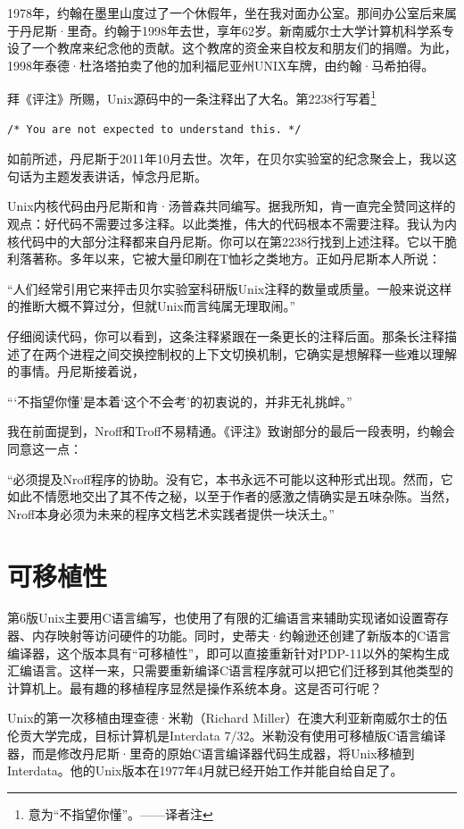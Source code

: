 \documentclass[a4paper,12pt,UTF8,twoside]{ctexbook}
\begin{document}
1978年，约翰在墨里山度过了一个休假年，坐在我对面办公室。那间办公室后来属于丹尼斯·里奇。约翰于1998年去世，享年62岁。新南威尔士大学计算机科学系专设了一个教席来纪念他的贡献。这个教席的资金来自校友和朋友们的捐赠。为此，1998年泰德·杜洛塔拍卖了他的加利福尼亚州UNIX车牌，由约翰·马希拍得。

拜《评注》所赐，Unix源码中的一条注释出了大名。第2238行写着\footnote{意为“不指望你懂”。——译者注}

\begin{lstlisting}
/* You are not expected to understand this. */
\end{lstlisting}


如前所述，丹尼斯于2011年10月去世。次年，在贝尔实验室的纪念聚会上，我以这句话为主题发表讲话，悼念丹尼斯。

Unix内核代码由丹尼斯和肯·汤普森共同编写。据我所知，肯一直完全赞同这样的观点：好代码不需要过多注释。以此类推，伟大的代码根本不需要注释。我认为内核代码中的大部分注释都来自丹尼斯。你可以在第2238行找到上述注释。它以干脆利落著称。多年以来，它被大量印刷在T恤衫之类地方。正如丹尼斯本人所说：

“人们经常引用它来抨击贝尔实验室科研版Unix注释的数量或质量。一般来说这样的推断大概不算过分，但就Unix而言纯属无理取闹。”

仔细阅读代码，你可以看到，这条注释紧跟在一条更长的注释后面。那条长注释描述了在两个进程之间交换控制权的上下文切换机制，它确实是想解释一些难以理解的事情。丹尼斯接着说，

“‘不指望你懂’是本着‘这个不会考’的初衷说的，并非无礼挑衅。”

我在前面提到，Nroff和Troff不易精通。《评注》致谢部分的最后一段表明，约翰会同意这一点：

“必须提及Nroff程序的协助。没有它，本书永远不可能以这种形式出现。然而，它如此不情愿地交出了其不传之秘，以至于作者的感激之情确实是五味杂陈。当然，Nroff本身必须为未来的程序文档艺术实践者提供一块沃土。”

\section{可移植性}

第6版Unix主要用C语言编写，也使用了有限的汇编语言来辅助实现诸如设置寄存器、内存映射等访问硬件的功能。同时，史蒂夫·约翰逊还创建了新版本的C语言编译器，这个版本具有“可移植性”，即可以直接重新针对PDP-11以外的架构生成汇编语言。这样一来，只需要重新编译C语言程序就可以把它们迁移到其他类型的计算机上。最有趣的移植程序显然是操作系统本身。这是否可行呢？

Unix的第一次移植由理查德·米勒（Richard Miller）在澳大利亚新南威尔士的伍伦贡大学完成，目标计算机是Interdata 7/32。米勒没有使用可移植版C语言编译器，而是修改丹尼斯·里奇的原始C语言编译器代码生成器，将Unix移植到Interdata。他的Unix版本在1977年4月就已经开始工作并能自给自足了。
\end{document}
